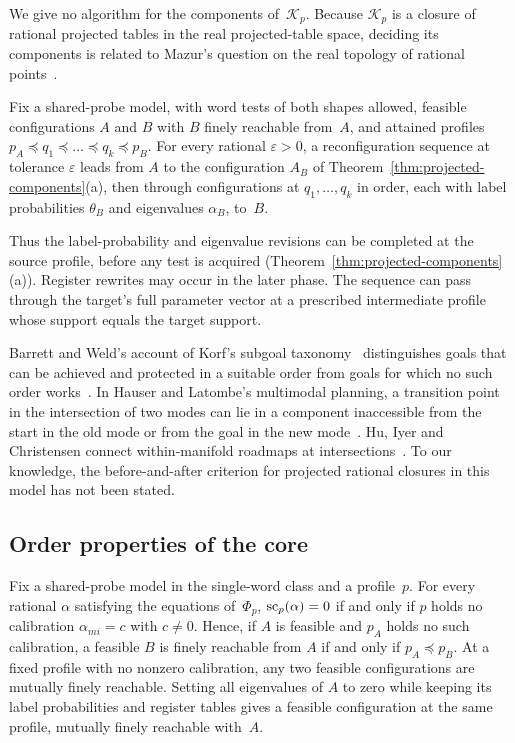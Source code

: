 We give no algorithm for the components of~$\mathcal K_p$. Because
$\mathcal K_p$ is a closure of rational projected tables in the real
projected-table space, deciding its components is related to Mazur's
question on the real topology of rational points~\cite{mazur}.

\begin{proposition}\label{prop:source-schedule}
Fix a shared-probe model, with word tests of both shapes allowed, feasible
configurations $A$ and $B$ with $B$ finely reachable from~$A$,
and attained profiles $p_A\preceq q_1\preceq\dots\preceq q_k\preceq p_B$.
For every rational $\varepsilon>0$, a reconfiguration sequence at
tolerance $\varepsilon$ leads from $A$ to the configuration $A_B$ of
Theorem~\ref{thm:projected-components}(a), then through configurations at
$q_1,\dots,q_k$ in order, each with label probabilities $\theta_B$ and
eigenvalues $\alpha_B$, to~$B$.
\end{proposition}

Thus the label-probability and eigenvalue revisions can be completed at
the source profile, before any test is acquired (Theorem~\ref{thm:projected-components}(a)).
Register rewrites may occur in the later phase. The sequence can pass
through the target's full parameter vector at a prescribed intermediate
profile whose support equals the target support.

Barrett and Weld's account of Korf's subgoal taxonomy~\cite{korf}
distinguishes goals that can be achieved and protected in a suitable order
from goals for which no such order
works~\cite[Sections~3.2--3.3]{barrettweld}. In Hauser and Latombe's
multimodal planning, a transition point in the intersection of two modes
can lie in a component inaccessible from the start in the old mode or from
the goal in the new mode~\cite[Sections~2.3--2.5]{hauserlatombe}. Hu, Iyer
and Christensen connect within-manifold roadmaps at
intersections~\cite[Section~IV.B]{huiyerchristensen}. To our knowledge,
the before-and-after criterion for projected rational closures in this
model has not been stated.

\subsection{Order properties of the core}\label{sec:core-order}

\begin{theorem}\label{thm:no-calibration}
Fix a shared-probe model in the single-word class and a profile~$p$. For
every rational $\alpha$ satisfying the equations of~$\Phi_p$,
$\operatorname{sc}_p(\alpha)=0$ if and only if $p$ holds no calibration
$\alpha_{mi}=c$ with $c\neq0$. Hence, if $A$ is feasible and $p_A$ holds
no such calibration, a feasible $B$ is finely reachable from $A$ if and
only if $p_A\preceq p_B$.
At a fixed profile with no nonzero calibration, any two feasible
configurations are mutually finely reachable. Setting all eigenvalues of
$A$ to zero while keeping its label probabilities and register tables gives
a feasible configuration at the same profile, mutually finely reachable
with~$A$.
\end{theorem}

